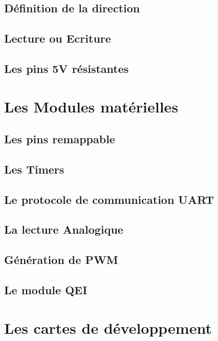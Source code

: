 \documentclass[a4paper]{article}
\begin{document}
	\subsection{Définition de la direction}
	
	\subsection{Lecture ou Ecriture}
	
	\subsection{Les pins 5V résistantes}

\section{Les Modules matérielles}
	\subsection{Les pins remappable}
	
	\subsection{Les Timers}
	
	\subsection{Le protocole de communication UART}
	
	\subsection{La lecture Analogique}
	
	\subsection{Génération de PWM}
	
	\subsection{Le module QEI}
	

\section{Les cartes de développement}
\end{document}
